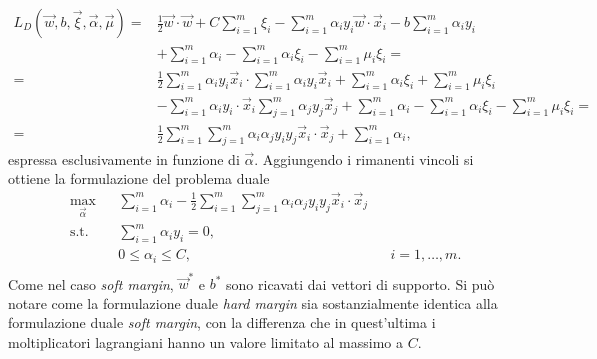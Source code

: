 \begin{equation}
\begin{split}
L_D(\Vec{w},b, \Vec{\xi}, \Vec{\alpha}, \Vec{\mu}) = & \frac{1}{2}\Vec{w}\cdot\Vec{w} + C\sum_{i=1}^{m} \xi_i - \sum_{i=1}^{m} \alpha_i y_i \Vec{w}\cdot \Vec{x}_i - b \sum_{i=1}^{m} \alpha_i y_i \\ & + \sum_{i=1}^{m} \alpha_i - \sum_{i=1}^{m} \alpha_i\xi_i - \sum_{i=1}^{m}\mu_i\xi_i =\\
= & \frac{1}{2}\sum_{i=1}^{m}\alpha_iy_i\Vec{x}_i \cdot \sum_{i=1}^{m}\alpha_iy_i\Vec{x}_i  + \sum_{i=1}^{m}\alpha_i\xi_i + \sum_{i=1}^{m}\mu_i\xi_i \\
& - \sum_{i=1}^{m} \alpha_i y_i  \cdot \Vec{x}_i \sum_{j=1}^{m}\alpha_jy_j\Vec{x}_j + \sum_{i=1}^{m} \alpha_i - \sum_{i=1}^{m} \alpha_i\xi_i - \sum_{i=1}^{m}\mu_i\xi_i =\\
=& \frac{1}{2}\sum_{i=1}^{m}\sum_{j=1}^{m}\alpha_i\alpha_jy_iy_j\Vec{x}_i\cdot\Vec{x}_j + \sum_{i=1}^{m} \alpha_i,
\end{split}  
\end{equation}
espressa esclusivamente in funzione di $\Vec{\alpha}$.
Aggiungendo i rimanenti vincoli si ottiene la formulazione del problema duale
\begin{equation}\label{eq:svc:softmargin:wolfe_dual}
\begin{aligned}
& \max_{\vec{\alpha}}    && \sum_{i=1}^{m}\alpha_i - \frac{1}{2}\sum_{i=1}^{m}\sum_{j=1}^{m}\alpha_i\alpha_jy_iy_j\Vec{x}_i\cdot\Vec{x}_j\\
& \textrm{s.t.} && \sum_{i=1}^{m} \alpha_iy_i = 0, \\
&               && 0 \leq \alpha_i \leq C, && i=1,\dots,m. \\
\end{aligned}
\end{equation}
Come nel caso \emph{soft margin}, $\Vec{w}^*$ e $b^*$ sono ricavati dai vettori di supporto.
Si può notare come la formulazione duale \emph{hard margin} sia sostanzialmente identica alla formulazione duale \emph{soft margin}, con la differenza che in quest'ultima i moltiplicatori lagrangiani hanno un valore limitato al massimo a $C$.




